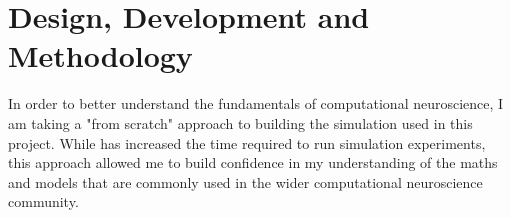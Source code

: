 \chapter{Design, Development and Methodology}


In order to better understand the fundamentals of computational neuroscience, I
am taking a "from scratch" approach to building the simulation used in this
project. While has increased the time required to run simulation experiments,
this approach allowed me to build confidence in my understanding of the maths
and models that are commonly used in the wider computational neuroscience
community.




